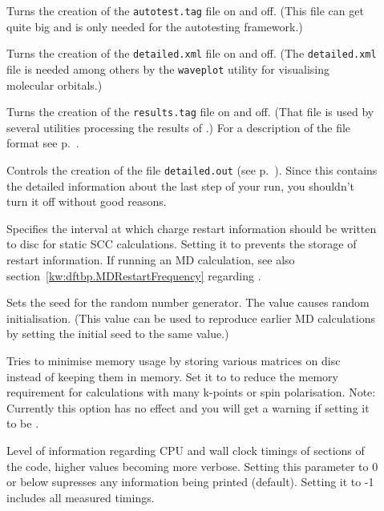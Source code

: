 \begin{description}

\item[] Turns the creation of the
  \verb|autotest.tag| file on and off. (This file can get quite big
  and is only needed for the autotesting framework.)

\item[] Turns the creation of the
  \verb|detailed.xml| file on and off. (The \verb|detailed.xml| file
  is needed among others by the \verb|waveplot| utility for
  visualising molecular orbitals.)

\item[] Turns the creation of the \verb|results.tag| file on
  and off. (That file is used by several utilities processing the results of
  \dftbp.) For a description of the file format see
  p.~.

\item[] Controls the creation of the file
  \verb|detailed.out| (see p.~). Since this contains
  the detailed information about the last step of your run, you shouldn't turn
  it off without good reasons.

\item[] Specifies the interval at which charge
  restart information should be written to disc for static SCC
  calculations. Setting it to  prevents the storage of restart
  information. If running an MD calculation, see also
  section~\ref{kw:dftbp.MDRestartFrequency} regarding .

\item[] Sets the seed for the random number
  generator. The value  causes random initialisation. (This
  value can be used to reproduce earlier MD calculations by setting
  the initial seed to the same value.)

\item[] Tries to minimise memory usage by
  storing various matrices on disc instead of keeping them in memory.
  Set it to  to reduce the memory requirement for calculations
  with many k-points or spin polarisation. Note: Currently this option has no
  effect and you will get a warning if setting it to be .

\item[] Level of information regarding CPU and wall clock
  timings of sections of the code, higher values becoming more verbose. Setting
  this parameter to 0 or below supresses any information being printed
  (default). Setting it to -1 includes all measured timings.


\end{description}
